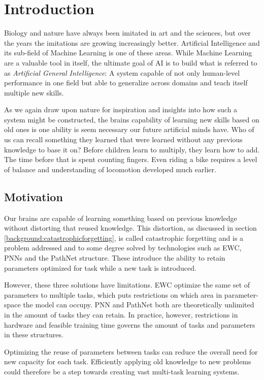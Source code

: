 \chapter{Introduction}

Biology and nature have always been imitated in art and the sciences, but over the years the imitations are growing increasingly better. Artificial Intelligence and its sub-field of Machine Learning is one of these areas. While Machine Learning are a valuable tool in itself, the ultimate goal of AI is to build what is referred to as \textit{Artificial General Intelligence}: A system capable of not only human-level performance in one field but able to generalize across domains and teach itself multiple new skills. 

As we again draw upon nature for inspiration and insights into how such a system might be constructed, the brains capability of learning new skills based on old ones is one ability is seem necessary our future  artificial minds have. Who of us can recall something they learned that were learned without any previous knowledge to base it on? Before children learn to multiply, they learn how to add. The time before that is spent counting fingers. Even riding a bike requires a level of balance and understanding of locomotion developed much earlier.

\section{Motivation}
Our brains are capable of learning something based on previous knowledge without distorting that reused knowledge. This distortion, as discussed in section \ref{background:catastrophicforgetting}, is called catastrophic forgetting and is a problem addressed and to some degree solved by technologies such as EWC\cite{ewc}, PNNs\cite{progressiveneuralnetworks} and the PathNet structure\cite{pathnet}. These introduce the ability to retain parameters optimized for task while a new task is introduced. 

However, these three solutions have limitations. EWC optimize the same set of parameters to multiple tasks, which puts restrictions on which area in parameter-space the model can occupy. PNN and PathNet both are theoretically unlimited in the amount of tasks they can retain. In practice, however, restrictions in hardware and feasible training time governs the amount of tasks and parameters in these structures. 

Optimizing the reuse of parameters between tasks can reduce the overall need for new capacity for each task. Efficiently applying old knowledge to new problems could therefore be a step towards creating vast multi-task learning systems. 

